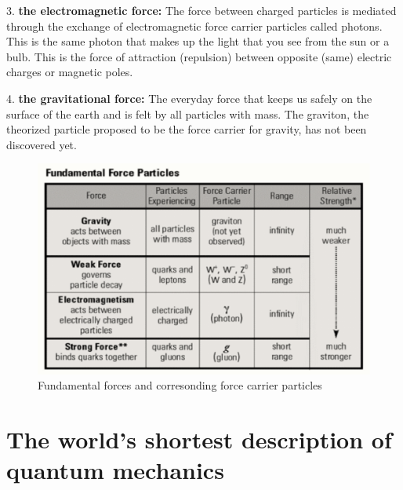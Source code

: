 3.	{\bf the electromagnetic force:}
The force between charged particles is mediated through the exchange of electromagnetic force carrier particles called photons.  This is the same photon that makes up the light that you see from the sun or a bulb. This is the force of attraction (repulsion) between opposite (same) electric charges or magnetic poles. 

4.	{\bf the gravitational force: }
The everyday force that keeps us safely on the surface of the earth and is felt by all particles with mass. The graviton, the theorized particle proposed to be the force carrier for gravity, 
has not been discovered yet. 


\begin{figure}[h]
\centering\includegraphics[scale=0.5]{./ElementaryParticles/Pictures/fig4.pdf}
\caption{Fundamental forces and corresonding force carrier particles}
\label{fig:fig4}
\end{figure}


\section{The world's shortest description of quantum mechanics}


